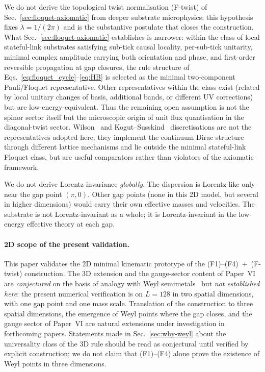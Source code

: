 \documentclass[11pt,a4paper]{article}
\begin{document}
We do not derive the topological twist normalisation
(F-twist) of Sec.~\ref{sec:floquet-axiomatic} from deeper
substrate microphysics; this hypothesis fixes
$\lambda = 1/(2\pi)$ and is the substantive postulate that
closes the construction. What
Sec.~\ref{sec:floquet-axiomatic} establishes is narrower:
within the class of local stateful-link substrates satisfying
sub-tick causal locality, per-sub-tick unitarity, minimal complex
amplitude carrying both orientation and phase, and first-order
reversible propagation at gap closures, the rule structure of
Eqs.~\eqref{eq:floquet_cycle}--\eqref{eq:HB} is selected as the
minimal two-component Pauli/Floquet representative. Other
representatives within the class exist (related by local unitary
changes of basis, additional bands, or different UV corrections)
but are low-energy-equivalent. Thus the remaining open
assumption is not the spinor sector itself but the microscopic
origin of unit flux quantisation in the diagonal-twist sector.
Wilson~\cite{wilson1974} and Kogut--Susskind~\cite{kogut1975}
discretisations are not the representatives adopted here; they
implement the continuum Dirac structure through different
lattice mechanisms and lie outside the minimal stateful-link
Floquet class, but are useful comparators rather than violators
of the axiomatic framework.

We do not derive Lorentz invariance \emph{globally}. The
dispersion is Lorentz-like only near the gap point $(\pi, 0)$.
Other gap points (none in this 2D model, but several in higher
dimensions) would carry their own effective masses and
velocities. The substrate is not Lorentz-invariant as a whole;
it is Lorentz-invariant in the low-energy effective theory at
each gap.

\paragraph{2D scope of the present validation.}
This paper validates the 2D minimal kinematic prototype of the
(F1)--(F4)~+~(F-twist) construction. The 3D extension and the
gauge-sector content of Paper~VI are \emph{conjectured} on the
basis of analogy with Weyl semimetals~\cite{wan2011,
armitage2018} but \emph{not established here}: the present
numerical verification is on $L = 128$ in two spatial
dimensions, with one gap point and one mass scale. Translation
of the construction to three spatial dimensions, the emergence
of Weyl points where the gap closes, and the gauge sector of
Paper~VI are natural extensions under investigation in
forthcoming papers. Statements made in
Sec.~\ref{sec:why-weyl} about the universality class of the
3D rule should be read as conjectural until verified by
explicit construction; we do not claim that (F1)--(F4) alone
prove the existence of Weyl points in three dimensions.
\end{document}
